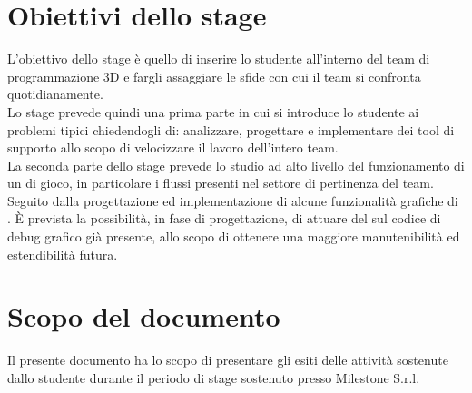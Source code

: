 \section{Obiettivi dello stage}

L'obiettivo dello stage è quello di inserire lo studente all'interno del team di programmazione 3D e fargli assaggiare le sfide con cui il team si confronta quotidianamente.\\

Lo stage prevede quindi una prima parte in cui si introduce lo studente ai problemi tipici chiedendogli di: analizzare, progettare e implementare dei tool di supporto allo scopo di velocizzare il lavoro dell'intero team.\\

La seconda parte dello stage prevede lo studio ad alto livello del funzionamento di un  di gioco, in particolare i flussi presenti nel settore di pertinenza del team. Seguito dalla progettazione ed implementazione di alcune funzionalità grafiche di . È prevista la possibilità, in fase di progettazione, di attuare del  sul codice di debug grafico già presente, allo scopo di ottenere una maggiore manutenibilità ed estendibilità futura.

\section{Scopo del documento}

Il presente documento ha lo scopo di presentare gli esiti delle attività sostenute dallo studente durante il periodo di stage sostenuto presso Milestone S.r.l.\\

